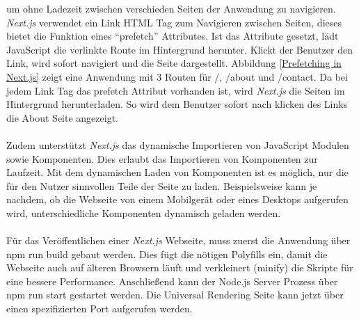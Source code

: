 \documentclass[runningheads]{llncs}
\begin{document}
um ohne Ladezeit zwischen verschieden Seiten der Anwendung zu navigieren. 
\textit{Next.js} verwendet ein Link HTML Tag zum Navigieren zwischen Seiten, 
dieses bietet die Funktion eines “prefetch” Attributes. 
Ist das Attribute gesetzt, 
lädt JavaScript die verlinkte Route im Hintergrund herunter. 
Klickt der Benutzer den Link, 
wird sofort navigiert und die Seite dargestellt. 
Abbildung \ref{Prefetching in Next.js} zeigt eine Anwendung mit 3 Routen für /, /about und /contact. 
Da bei jedem Link Tag das prefetch Attribut vorhanden ist, 
wird \textit{Next.js} die Seiten im Hintergrund herunterladen. 
So wird dem Benutzer sofort nach klicken des Links die About Seite angezeigt.
\\
\\
Zudem unterstützt \textit{Next.js} das dynamische Importieren von JavaScript Modulen sowie Komponenten. 
Dies erlaubt das Importieren von Komponenten zur Laufzeit. 
Mit dem dynamischen Laden von Komponenten ist es möglich, 
nur die für den Nutzer sinnvollen Teile der Seite zu laden. 
Beispielsweise kann je nachdem, 
ob die Webseite von einem Mobilgerät oder eines Desktops aufgerufen wird, 
unterschiedliche Komponenten dynamisch geladen werden. 
\\
\\
Für das Veröffentlichen einer \textit{Next.js} Webseite, 
muss zuerst die Anwendung über npm run build gebaut werden. 
Dies fügt die nötigen Polyfills ein, 
damit die Webseite auch auf älteren Browsern läuft und 
verkleinert (minify) die Skripte für eine bessere Performance. 
Anschließend kann der Node.js Server Prozess über npm run start gestartet werden. 
Die Universal Rendering Seite kann jetzt über einen spezifizierten Port aufgerufen werden. \cite{arunoda} \cite{AlexMoldovan-siderenderinginReact}
\end{document}
